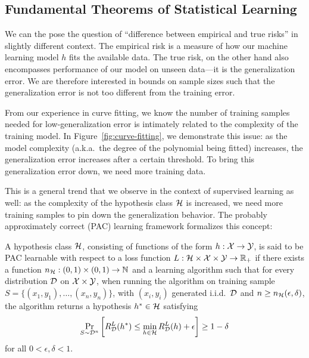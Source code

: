 \subsection{Fundamental Theorems of Statistical Learning}

We can the pose the question of ``difference between empirical and true risks''
in slightly different context. The empirical risk is a measure of how our
machine learning model $h$ fits the available data. The true risk, on the other
hand also encompasses performance of our model on unseen data---it is the
generalization error. We are therefore interested in bounds on sample sizes such
that the generalization error is not too different from the training error.

From our experience in curve fitting, we know the number of training samples
needed for low-generalization error is intimately related to the complexity of
the training model. In Figure~\ref{fig:curve-fitting}, we demonstrate this
issue: as the model complexity (a.k.a.\ the degree of the polynomial being
fitted) increases, the generalization error increases after a certain threshold.
To bring this generalization error down, we need more training data.

This is a general trend that we observe in the context of supervised learning as
well: as the complexity of the hypothesis class $\mathcal{H}$ is increased, we need more
training samples to pin down the generalization behavior. The probably
approximately correct (PAC) learning framework formalizes this concept:

\begin{definition}
  A hypothesis class $\mathcal{H}$, consisting of functions of the form $h : \mathcal{X} \to
  \mathcal{Y}$, is said to be PAC learnable with respect to a loss function $L : \mathcal{H}
  \times \mathcal{X} \times \mathcal{Y} \to \mathbb{R}_+$ if there exists a function $n_{\mathcal{H}} : (0, 1)
  \times (0, 1) \to \mathbb{N}$ and a learning algorithm such that for every
  distribution $\mathcal{D}$ on $\mathcal{X} \times \mathcal{Y}$, when running the algorithm on training
  sample $S = \{(x_1, y_1), \ldots, (x_n, y_n)\}$, with $(x_i, y_i)$ generated
  i.i.d.\ $\mathcal{D}$ and $n \geq n_{\mathcal{H}}(\epsilon, \delta)$, the algorithm returns a
  hypothesis $h^* \in \mathcal{H}$ satisfying
  \begin{equation}
    \Pr_{S \sim \mathcal{D}^n}\left[R_{\mathcal{D}}^L(h^*) \leq \min_{h \in \mathcal{H}} R_{\mathcal{D}}^L(h) +
    \epsilon\right] \geq 1 - \delta
  \end{equation}
  for all $0 < \epsilon, \delta < 1$.
\end{definition}

